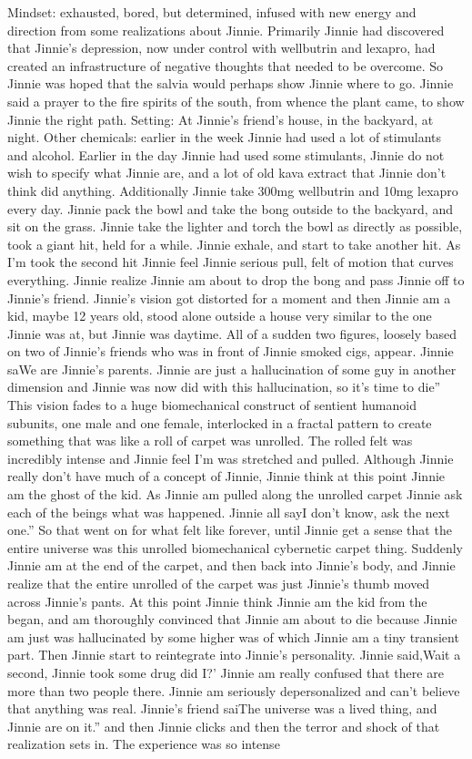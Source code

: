 \documentclass[12pt]{book}
\begin{document}
Mindset: exhausted, bored, but determined, infused with new energy and direction from some realizations about Jinnie. Primarily Jinnie had discovered that Jinnie's depression, now under control with wellbutrin and lexapro, had created an infrastructure of negative thoughts that needed to be overcome. So Jinnie was hoped that the salvia would perhaps show Jinnie where to go. Jinnie said a prayer to the fire spirits of the south, from whence the plant came, to show Jinnie the right path. Setting: At Jinnie's friend's house, in the backyard, at night. Other chemicals: earlier in the week Jinnie had used a lot of stimulants and alcohol. Earlier in the day Jinnie had used some stimulants, Jinnie do not wish to specify what Jinnie are, and a lot of old kava extract that Jinnie don't think did anything. Additionally Jinnie take 300mg wellbutrin and 10mg lexapro every day. Jinnie pack the bowl and take the bong outside to the backyard, and sit on the grass. Jinnie take the lighter and torch the bowl as directly as possible, took a giant hit, held for a while. Jinnie exhale, and start to take another hit. As I'm took the second hit Jinnie feel Jinnie serious pull, felt of motion that curves everything. Jinnie realize Jinnie am about to drop the bong and pass Jinnie off to Jinnie's friend. Jinnie's vision got distorted for a moment and then Jinnie am a kid, maybe 12 years old, stood alone outside a house very similar to the one Jinnie was at, but Jinnie was daytime. All of a sudden two figures, loosely based on two of Jinnie's friends who was in front of Jinnie smoked cigs, appear. Jinnie saWe are Jinnie's parents. Jinnie are just a hallucination of some guy in another dimension and Jinnie was now did with this hallucination, so it's time to die'' This vision fades to a huge biomechanical construct of sentient humanoid subunits, one male and one female, interlocked in a fractal pattern to create something that was like a roll of carpet was unrolled. The rolled felt was incredibly intense and Jinnie feel I'm was stretched and pulled. Although Jinnie really don't have much of a concept of Jinnie, Jinnie think at this point Jinnie am the ghost of the kid. As Jinnie am pulled along the unrolled carpet Jinnie ask each of the beings what was happened. Jinnie all sayI don't know, ask the next one.'' So that went on for what felt like forever, until Jinnie get a sense that the entire universe was this unrolled biomechanical cybernetic carpet thing. Suddenly Jinnie am at the end of the carpet, and then back into Jinnie's body, and Jinnie realize that the entire unrolled of the carpet was just Jinnie's thumb moved across Jinnie's pants. At this point Jinnie think Jinnie am the kid from the began, and am thoroughly convinced that Jinnie am about to die because Jinnie am just was hallucinated by some higher was of which Jinnie am a tiny transient part. Then Jinnie start to reintegrate into Jinnie's personality. Jinnie said,Wait a second, Jinnie took some drug did I?' Jinnie am really confused that there are more than two people there. Jinnie am seriously depersonalized and can't believe that anything was real. Jinnie's friend saiThe universe was a lived thing, and Jinnie are on it.'' and then Jinnie clicks and then the terror and shock of that realization sets in. The experience was so intense 
\end{document}
